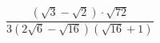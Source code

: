 \begin{ex}[type=calculate]
	\begin{condition}
		\( \dfrac{(\sqrt{3}-\sqrt{2})\cdot\sqrt{72}}{3(2\sqrt{6}-\sqrt{16})(\sqrt{16}+1)} \)
	\end{condition}
\end{ex}